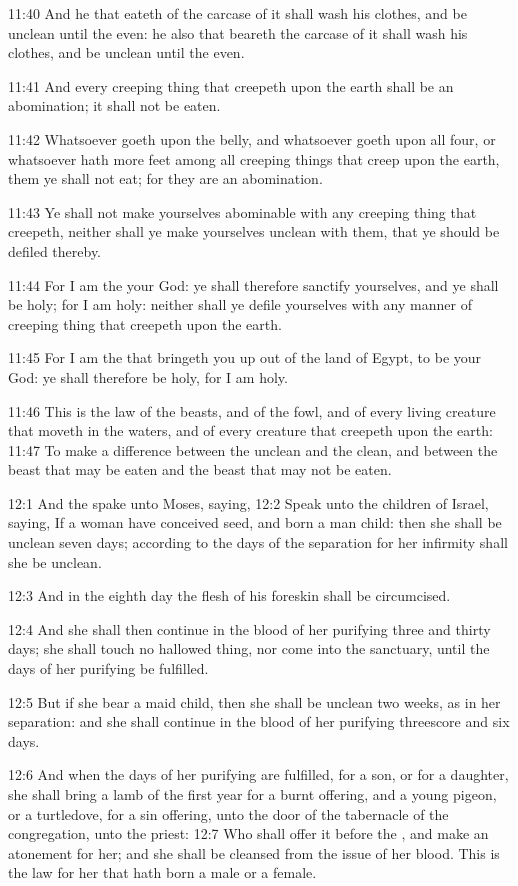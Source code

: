 11:40 And he that eateth of the carcase of it shall wash his clothes, and be unclean until the even: he also that beareth the carcase of it shall wash his clothes, and be unclean until the even.

11:41 And every creeping thing that creepeth upon the earth shall be an abomination; it shall not be eaten.

11:42 Whatsoever goeth upon the belly, and whatsoever goeth upon all four, or whatsoever hath more feet among all creeping things that creep upon the earth, them ye shall not eat; for they are an abomination.

11:43 Ye shall not make yourselves abominable with any creeping thing that creepeth, neither shall ye make yourselves unclean with them, that ye should be defiled thereby.

11:44 For I am the \LORD your God: ye shall therefore sanctify yourselves, and ye shall be holy; for I am holy: neither shall ye defile yourselves with any manner of creeping thing that creepeth upon the earth.

11:45 For I am the \LORD that bringeth you up out of the land of Egypt, to be your God: ye shall therefore be holy, for I am holy.

11:46 This is the law of the beasts, and of the fowl, and of every living creature that moveth in the waters, and of every creature that creepeth upon the earth: 11:47 To make a difference between the unclean and the clean, and between the beast that may be eaten and the beast that may not be eaten.

12:1 And the \LORD spake unto Moses, saying, 12:2 Speak unto the children of Israel, saying, If a woman have conceived seed, and born a man child: then she shall be unclean seven days; according to the days of the separation for her infirmity shall she be unclean.

12:3 And in the eighth day the flesh of his foreskin shall be circumcised.

12:4 And she shall then continue in the blood of her purifying three and thirty days; she shall touch no hallowed thing, nor come into the sanctuary, until the days of her purifying be fulfilled.

12:5 But if she bear a maid child, then she shall be unclean two weeks, as in her separation: and she shall continue in the blood of her purifying threescore and six days.

12:6 And when the days of her purifying are fulfilled, for a son, or for a daughter, she shall bring a lamb of the first year for a burnt offering, and a young pigeon, or a turtledove, for a sin offering, unto the door of the tabernacle of the congregation, unto the priest: 12:7 Who shall offer it before the \LORD, and make an atonement for her; and she shall be cleansed from the issue of her blood. This is the law for her that hath born a male or a female.

